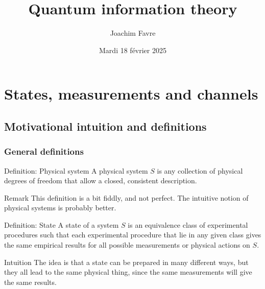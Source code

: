 \documentclass[a4paper]{article}
\title{Quantum information theory}
\author{Joachim Favre}
\date{Mardi 18 février 2025}
\begin{document}
\maketitle


\section{States, measurements and channels}

\subsection{Motivational intuition and definitions}
\subsubsection{General definitions}

\begin{parag}{Definition: Physical system}
    A physical system $S$ is any collection of physical degrees of freedom that allow a closed, consistent description.

    \begin{subparag}{Remark}
        This definition is a bit fiddly, and not perfect. The intuitive notion of physical systems is probably better.
    \end{subparag}
\end{parag}

\begin{parag}{Definition: State}
    A state of a system $S$ is an equivalence class of experimental procedures such that each experimental procedure that lie in any given class gives the same empirical results for all possible measurements or physical actions on $S$.

    \begin{subparag}{Intuition}
        The idea is that a state can be prepared in many different ways, but they all lead to the same physical thing, since the same measurements will give the same results.
    \end{subparag}
\end{parag}
\end{document}
